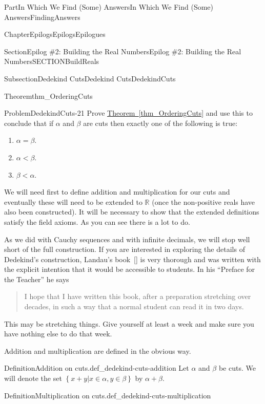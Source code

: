 \documentclass[oneside,10pt,]{book}
\newcommand{\xreffont}{\relax}
\numberwithin{equation}{part}
\newcommand{\RR}{\mathbb {R}}
\newcommand{\lt}{<}
\begin{document}
\begin{partptx}{Part}{In Which We Find (Some) Answers}{}{In Which We Find (Some) Answers}{}{}{FindingAnswers}
\begin{chapterptx}{Chapter}{Epilogs}{}{Epilogs}{}{}{Epilogues}
\begin{sectionptx}{Section}{Epilog \#2: Building the Real Numbers}{}{Epilog \#2: Building the Real Numbers}{}{}{SECTIONBuildReals}
\begin{subsectionptx}{Subsection}{Dedekind Cuts}{}{Dedekind Cuts}{}{}{DedekindCuts}
\begin{theorem}{Theorem}{}{}{thm_OrderingCuts}
\end{theorem}
\begin{problem}{Problem}{}{DedekindCuts-21}%
Prove \hyperref[thm_OrderingCuts]{Theorem~{\xreffont\ref{thm_OrderingCuts}}} and use this to conclude that if \(\alpha\) and \(\beta\) are cuts then exactly one of the following is true:%
\begin{enumerate}
\item{}\(\alpha=\beta\).%
\item{}\(\alpha\lt \beta\).%
\item{}\(\beta\lt \alpha\).%
\end{enumerate}
%
\end{problem}
We will need first to define addition and multiplication for our cuts and eventually these will need to be extended to \(\RR\) (once the non-positive reals have also been constructed).  It will be necessary to show that the extended definitions satisfy the field axioms.  As you can see there is a lot to do.%
\par
{} As we did with Cauchy sequences and with infinite decimals, we will stop well short of the full construction.  If you are interested in exploring the details of Dedekind's construction, Landau's book~\hyperlink{landau66__found_analy}{[{\xreffont 7}]} is very thorough and was written with the explicit intention that it would be accessible to students.  In his ``Preface for the Teacher'' he says%
\begin{quote}%
I hope that I have written this book, after a preparation stretching over decades, in such a way that a normal student can read it in two days.%
\end{quote}
This may be stretching things.  Give yourself at least a week and make sure you have nothing else to do that week.%
\par
Addition and multiplication are defined in the obvious way.%
\begin{definition}{Definition}{Addition on cuts.}{def_dedekind-cuts-addition}%
%
%
%
Let \(\alpha\) and \(\beta\) be cuts.  We will denote the set \(\left\{x+y|x\in\alpha,
y\in\beta\right\}\) by \(\alpha+\beta\).%
\end{definition}
\begin{definition}{Definition}{Multiplication on cuts.}{def_dedekind-cuts-multiplication}%
%
%

\end{definition}
\end{subsectionptx}
\end{sectionptx}
\end{chapterptx}
\end{partptx}
\end{document}
